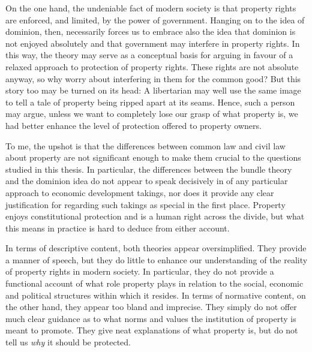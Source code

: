 On the one hand, the undeniable fact of modern society is that property rights are enforced, and limited, by the power of government. Hanging on to the idea of dominion, then, necessarily forces us to embrace also the idea that dominion is not enjoyed absolutely and that government may interfere in property rights. In this way, the theory may serve as a conceptual basis for arguing in favour of a relaxed approach to protection of property rights. These rights are not absolute anyway, so why worry about interfering in them for the common good? But this story too may be turned on its head: A libertarian may well use the same image to tell a tale of property being ripped apart at its seams. Hence, such a person may argue, unless we want to completely lose our grasp of what property is, we had better enhance the level of protection offered to property owners.

To me, the upshot is that the differences between common law and civil law  about property are not significant enough to make them crucial to the questions studied in this thesis. In particular, the differences between the bundle theory and the dominion idea do not appear to speak decisively in  of any particular approach to economic development takings, nor does it provide any clear justification for regarding such takings as special in the first place. Property enjoys constitutional protection and is a  human right across the divide, but what this means in practice is hard to deduce from either account.

In terms of descriptive content, both theories appear oversimplified. They provide a manner of speech, but they do little to enhance our understanding of the reality of property rights in modern society. In particular, they do not provide a functional account of what role property plays in relation to the social, economic and political structures within which it resides. In terms of normative content, on the other hand, they appear too bland and imprecise. They simply do not offer much clear guidance as to what norms and values the institution of property is meant to promote. They give neat explanations of what property is, but do not tell us {\it why} it should be protected. 

